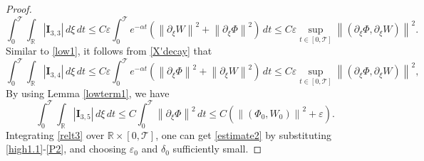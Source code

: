 \documentclass[12pt,reqno]{amsart}
\numberwithin{equation}{section}
\newcommand{\norm}[1]{\left\lVert #1 \right\rVert}
\newcommand{\abs}[1]{\left\lvert #1 \right\rvert}
\def\p{\partial}
\def\R{\mathbb{R}}
\def\T{\mathcal{T}}
\def\supt{\mathop{sup}\limits_{t \in [0,\mathcal{T}]}}
\begin{document}
\begin{proof}
\begin{equation}
			\int_{0}^{\T}\int_{\R}|\mathbf{I}_{3,3}|\,d\xi\,dt\leq C\varepsilon\int_{0}^{\T}e^{-\alpha t}(\norm{\p_{\xi}W}^2+\norm{\p_{\xi}\Phi}^2)\,dt\leq C\varepsilon\supt\norm{(\p_{\xi}\Phi,\p_{\xi}W)}^2.
	\end{equation}
	Similar to \eqref{low1}, it follows from \eqref{X'decay} that
	\begin{equation}\label{low2}
			\int_{0}^{\T}\int_{\R}|\mathbf{I}_{3,4}|\,d\xi \,dt\leq C\varepsilon\int_{0}^{\T}e^{-\alpha t} (\norm{\p_{\xi}\Phi}^2+\norm{\p_{\xi}W}^2)\,dt \leq C\varepsilon\supt\norm{(\p_{\xi}\Phi,\p_{\xi}W)}^2,
	\end{equation}
	By using Lemma \ref{lowterm1}, we have
	\begin{equation}\label{P2}
			\int_{0}^{\T}\int_{\R} \abs{\mathbf{I}_{3,5}}\,d\xi\,dt\leq C\int_{0}^{\T}\norm{\p_{\xi}\Phi}^2\,dt \leq C(\norm{(\Phi_0,W_0)}^2+\varepsilon).
	\end{equation}
	Integrating \eqref{relt3} over $\R \times [0,\T]$,  one can get
	\eqref{estimate2} by substituting \eqref{high1.1}-\eqref{P2}, and choosing $\varepsilon_0$ and $\delta_0$ sufficiently small.
\end{proof}
\end{document}
